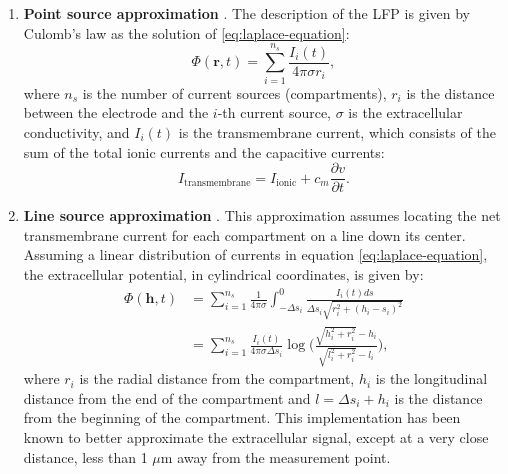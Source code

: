 \documentclass[../main.tex]{subfiles}
\begin{document}
\begin{enumerate}
\item \textbf{Point source approximation} \citep{holt_electrical_1999}.
The description of the LFP is given by Culomb's law as the solution of \eqref{eq:laplace-equation}:
\begin{equation}
    \Phi(\mathbf{r},t) = \sum_{i=1}^{n_s}\displaystyle\frac{I_i(t)}{4\pi\sigma r_i}, 
    \label{eq:point-source-approximation}
\end{equation}
where $n_s$ is the number of current sources (compartments), $r_i$ is the distance between the electrode and the $i$-th current source, $\sigma$ is the extracellular conductivity, and $I_i(t)$ is the transmembrane current, which consists of the sum of the total ionic currents and the capacitive currents:
\begin{equation}
    I_\text{transmembrane} = I_\text{ionic} + c_m\displaystyle\frac{\partial v}{\partial t}.
    \label{eq:transmembrane-current}
\end{equation}
\item \textbf{Line source approximation} \cite{gold_origin_2006}.
This approximation assumes locating the net transmembrane current for each compartment on a line down its center.
Assuming a linear distribution of currents in equation \eqref{eq:laplace-equation}, the extracellular potential, in cylindrical coordinates, is given by:
\begin{equation}
    \begin{aligned}
        \Phi(\mathbf{h},t) &= \sum_{i=1}^{n_s} \frac{1}{4\pi \sigma}\int_{-\Delta s_i}^{0}\displaystyle\frac{I_i(t) ds}{\Delta s_i\sqrt{r_i^2+(h_i-s_i)^2}} \\
        \quad &  = \sum_{i=1}^{n_s} \frac{I_i(t)}{4\pi \sigma\Delta s_i} \log \Bigg( \displaystyle\frac{\sqrt{h_i^2+r_i^2}-h_i}{\sqrt{l_i^2+r_i^2}-l_i} \Bigg), 
    \end{aligned}
        \label{eq:line-source-approximation}
    \end{equation}
where $r_i$ is the radial distance from the compartment, $h_i$ is the longitudinal distance from the end of the compartment and $l = \Delta s_i + h_i$ is the distance from the beginning of the compartment. 
This implementation has been known to better approximate the extracellular signal, except at a very close distance, less than 1 $\mu$m away from the measurement point.


\end{enumerate}
\end{document}
